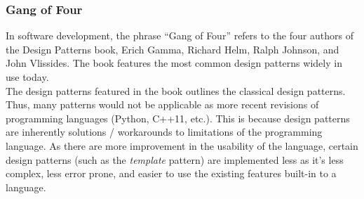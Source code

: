 \begin{multicols}{2}
\subsubsection{Gang of Four}

In software development, the phrase ``Gang of Four'' refers to the four authors of the Design Patterns book, Erich Gamma, Richard Helm, Ralph Johnson, and John Vlissides\cite{gof-wiki}\cite{gof}. The book features the most common design patterns widely in use today.\bs
\\
The design patterns featured in the book outlines the classical design patterns. Thus, many patterns would not be applicable as more recent revisions of programming languages (Python, C++11, etc.). This is because design patterns are inherently solutions / workarounds to limitations of the programming language. As there are more improvement in the usability of the language, certain design patterns (such as the \textit{template} pattern) are implemented less as it's less complex, less error prone, and easier to use the existing features built-in to a language.


\iftwocolumns
\end{multicols}
\fi
